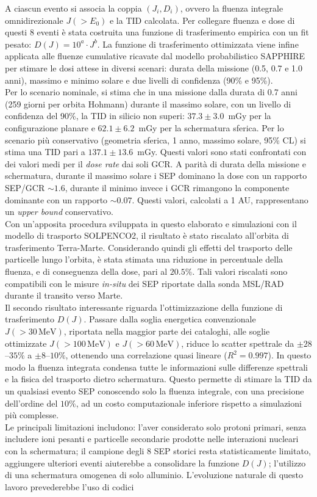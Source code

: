 \documentclass[a4paper,12pt]{article}
\begin{document}
A ciascun evento si associa la coppia $(J_i, D_i)$, ovvero la fluenza 
integrale omnidirezionale $J(>E_0)$ e la TID calcolata. 
Per collegare fluenza e dose di questi 8 eventi è stata costruita una funzione di trasferimento empirica con un fit pesato: $ D(J) = 10^{a} \cdot J^{b}$. La funzione di trasferimento ottimizzata viene infine applicata alle fluenze cumulative ricavate dal modello probabilistico SAPPHIRE per stimare le dosi attese in diversi scenari: durata della missione (0.5, 0.7 e 1.0 anni), massimo e minimo solare e due livelli di confidenza (90\% e 95\%).\\
Per lo scenario nominale, si stima che in una missione dalla durata di 0.7 anni (259 giorni per orbita Hohmann) durante il massimo solare, con un livello di confidenza del 90\%, la TID in silicio non superi: $37.3\pm3.0$~mGy per la configurazione planare e $62.1\pm6.2$~mGy per la schermatura sferica. Per lo scenario più conservativo (geometria sferica, 1 anno, massimo solare, 95\% CL) si stima una TID pari a $137.1\pm13.6$~mGy. Questi valori sono stati confrontati con dei valori medi per il \textit{dose rate} dai soli GCR. A parità di durata della missione e schermatura, durante il massimo solare i SEP dominano la dose con un rapporto SEP/GCR $\sim1.6$, durante il minimo invece i GCR rimangono la componente dominante con un rapporto $\sim0.07$. Questi valori, calcolati a 1 AU, rappresentano un \textit{upper bound} conservativo.\\ Con un'apposita procedura sviluppata in questo elaborato e simulazioni con il modello di trasporto SOLPENCO2, il risultato è stato riscalato all'orbita di trasferimento Terra-Marte. Considerando quindi gli effetti del trasporto delle particelle lungo l'orbita, è stata stimata una riduzione in percentuale della fluenza, e di conseguenza della dose, pari al $20.5\%$. Tali valori riscalati sono compatibili con le misure \textit{in-situ} dei SEP riportate dalla sonda MSL/RAD durante il transito verso Marte.\\ Il secondo risultato interessante riguarda l'ottimizzazione della funzione di trasferimento $D(J)$. Passare dalla soglia energetica convenzionale $J(>30\,\mathrm{MeV})$, riportata nella maggior parte dei cataloghi, alle soglie ottimizzate $J(>100\,\mathrm{MeV})$ e $J(>60\,\mathrm{MeV})$, riduce lo scatter spettrale da $\pm28$--$35\%$ a $\pm8$--$10\%$, ottenendo una correlazione quasi lineare ($R^2= 0.997$). In questo modo la fluenza integrata condensa tutte le informazioni sulle differenze spettrali e la fisica del trasporto dietro schermatura. Questo permette di stimare la TID da un qualsiasi evento SEP conoscendo solo la fluenza integrale, con una precisione dell'ordine del $10\%$, ad un costo computazionale inferiore rispetto a simulazioni più complesse.\\Le principali limitazioni includono: l'aver considerato solo protoni primari, senza includere ioni pesanti e particelle secondarie prodotte nelle interazioni nucleari con la schermatura; il campione degli 8 SEP storici resta statisticamente limitato, aggiungere ulteriori eventi aiuterebbe a consolidare la funzione $D(J)$; l'utilizzo di una schermatura omogenea di solo alluminio. L'evoluzione naturale di questo lavoro prevederebbe l'uso di codici 
\end{document}

